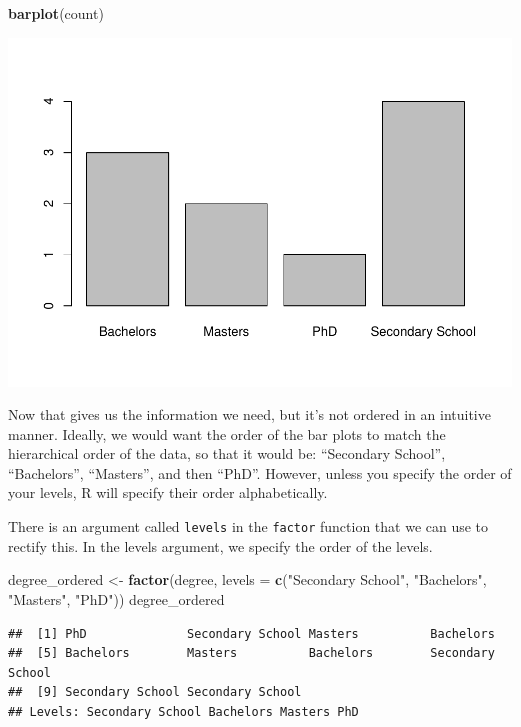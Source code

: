 \documentclass[
]{book}
\newenvironment{Shaded}{\begin{snugshade}}{\end{snugshade}}
\newcommand{\AttributeTok}[1]{\textcolor[rgb]{0.13,0.29,0.53}{#1}}
\newcommand{\FunctionTok}[1]{\textcolor[rgb]{0.13,0.29,0.53}{\textbf{#1}}}
\newcommand{\NormalTok}[1]{#1}
\newcommand{\OtherTok}[1]{\textcolor[rgb]{0.56,0.35,0.01}{#1}}
\newcommand{\StringTok}[1]{\textcolor[rgb]{0.31,0.60,0.02}{#1}}
\begin{document}
\begin{Shaded}
\begin{Highlighting}[]
\FunctionTok{barplot}\NormalTok{(count)}
\end{Highlighting}
\end{Shaded}

\includegraphics{rintro_demo_files/figure-latex/unnamed-chunk-134-1.pdf}

Now that gives us the information we need, but it's not ordered in an intuitive manner. Ideally, we would want the order of the bar plots to match the hierarchical order of the data, so that it would be: ``Secondary School'', ``Bachelors'', ``Masters'', and then ``PhD''. However, unless you specify the order of your levels, R will specify their order alphabetically.

There is an argument called \texttt{levels} in the \texttt{factor} function that we can use to rectify this. In the levels argument, we specify the order of the levels.

\begin{Shaded}
\begin{Highlighting}[]
\NormalTok{degree\_ordered }\OtherTok{\textless{}{-}} \FunctionTok{factor}\NormalTok{(degree, }\AttributeTok{levels =} \FunctionTok{c}\NormalTok{(}\StringTok{"Secondary School"}\NormalTok{, }\StringTok{"Bachelors"}\NormalTok{, }\StringTok{"Masters"}\NormalTok{, }\StringTok{"PhD"}\NormalTok{))}
\NormalTok{degree\_ordered}
\end{Highlighting}
\end{Shaded}

\begin{verbatim}
##  [1] PhD              Secondary School Masters          Bachelors       
##  [5] Bachelors        Masters          Bachelors        Secondary School
##  [9] Secondary School Secondary School
## Levels: Secondary School Bachelors Masters PhD
\end{verbatim}
\end{document}
